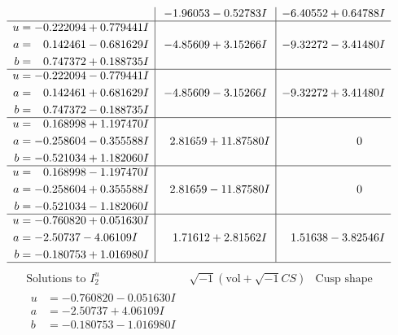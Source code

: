 \documentclass[1p]{elsarticle_modified}
\theoremstyle{definition}
\newcommand{\I}{\sqrt{-1}}
\begin{document}
$$\begin{array}{c|c|c}
 & -1.96053 - 0.52783 I & -6.40552 + 0.64788 I \\ \hline\begin{aligned}
u &= -0.222094 + 0.779441 I \\
a &= \phantom{-}0.142461 - 0.681629 I \\
b &= \phantom{-}0.747372 + 0.188735 I\end{aligned}
 & -4.85609 + 3.15266 I & -9.32272 - 3.41480 I \\ \hline\begin{aligned}
u &= -0.222094 - 0.779441 I \\
a &= \phantom{-}0.142461 + 0.681629 I \\
b &= \phantom{-}0.747372 - 0.188735 I\end{aligned}
 & -4.85609 - 3.15266 I & -9.32272 + 3.41480 I \\ \hline\begin{aligned}
u &= \phantom{-}0.168998 + 1.197470 I \\
a &= -0.258604 - 0.355588 I \\
b &= -0.521034 + 1.182060 I\end{aligned}
 & \phantom{-}2.81659 + 11.87580 I & \phantom{-0.000000 } 0 \\ \hline\begin{aligned}
u &= \phantom{-}0.168998 - 1.197470 I \\
a &= -0.258604 + 0.355588 I \\
b &= -0.521034 - 1.182060 I\end{aligned}
 & \phantom{-}2.81659 - 11.87580 I & \phantom{-0.000000 } 0 \\ \hline\begin{aligned}
u &= -0.760820 + 0.051630 I \\
a &= -2.50737 - 4.06109 I \\
b &= -0.180753 + 1.016980 I\end{aligned}
 & \phantom{-}1.71612 + 2.81562 I & \phantom{-}1.51638 - 3.82546 I\\
 \hline 
 \end{array}$$\newpage$$\begin{array}{c|c|c}  
\text{Solutions to }I^u_{2}& \I (\text{vol} + \sqrt{-1}CS) & \text{Cusp shape}\\
 \hline 
\begin{aligned}
u &= -0.760820 - 0.051630 I \\
a &= -2.50737 + 4.06109 I \\
b &= -0.180753 - 1.016980 I\end{aligned}

\end{array}$$
\end{document}
